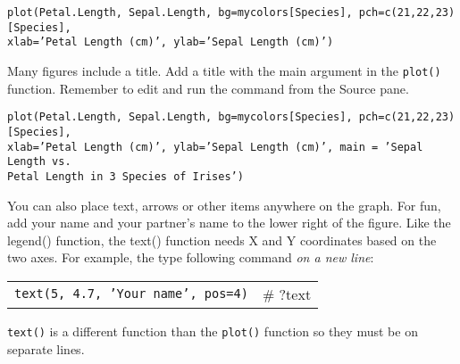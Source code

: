 \documentclass[11pt]{article}
\begin{document}
\texttt{plot(Petal.Length, Sepal.Length, bg=mycolors{[}Species{]},
pch=c(21,22,23){[}Species{]}, \\xlab='Petal Length (cm)', ylab='Sepal
Length (cm)')}

Many figures include a title. Add a title with the main argument
in the \texttt{plot()} function. Remember to edit and run the command from the Source pane.

\texttt{plot(Petal.Length, Sepal.Length, bg=mycolors{[}Species{]}, pch=c(21,22,23){[}Species{]}, \\
xlab='Petal Length (cm)', ylab='Sepal Length (cm)', main = 'Sepal Length vs. \\
Petal Length in 3 Species of Irises')}





You can also place text, arrows or other items anywhere on the graph.
For fun, add your name and your partner's name to the lower right of the
figure. Like the legend() function, the text() function needs X and Y
coordinates based on the two axes. For example, the type following command \textit{on a new line}:

\begin{tabular}{@{}L{4.25in}L{1.5in}@{}}
\texttt{text(5, 4.7, 'Your name', pos=4)} & \# ?text\\
\end{tabular}

\texttt{text()} is a different function than the \texttt{plot()} function so they must be on separate lines.
\end{document}
